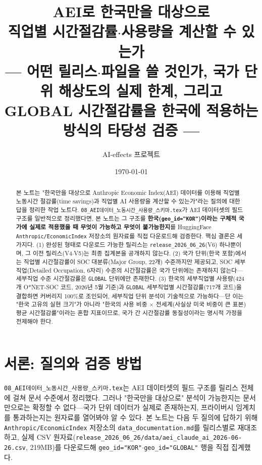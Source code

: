 \documentclass[11pt]{article}
\title{AEI로 한국만을 대상으로\\[1mm]
직업별 시간절감률$\cdot$사용량을 계산할 수 있는가\\[2mm]
\large --- 어떤 릴리스$\cdot$파일을 쓸 것인가, 국가 단위 해상도의 실제 한계, 그리고 GLOBAL 시간절감률을 한국에 적용하는 방식의 타당성 검증 ---}
\author{AI-effects 프로젝트}
\date{\today}
\begin{document}
\maketitle

\begin{abstract}
\noindent 본 노트는 "한국만을 대상으로 Anthropic Economic Index(AEI) 데이터를 이용해 직업별 노동시간 절감률(time savings)과 직업별 AI 사용량을 계산할 수 있는가"라는 질의에 대한 답을 정리한 작업 노트다. \texttt{08\_AEI데이터\_노동시간\_사용량\_스키마.tex}가 AEI 데이터셋의 필드 구조를 일반적으로 정리했다면, 본 노트는 그 구조를 \textbf{한국(\texttt{geo\_id="KOR"})이라는 구체적 국가에 실제로 적용했을 때 무엇이 가능하고 무엇이 불가능한지}를 HuggingFace \texttt{Anthropic/EconomicIndex} 저장소의 원자료를 직접 다운로드해 검증한다. 핵심 결론은 세 가지다. (1) 완성된 형태로 다운로드 가능한 릴리스는 \texttt{release\_2026\_06\_26}(V6) 하나뿐이며, 그 이전 릴리스(V4$\cdot$V5)는 최종 집계본을 공개하지 않는다. (2) 국가 단위(한국 포함)에서는 직업별 시간절감률이 SOC 대분류(Major Group, 22개) 수준까지만 제공되고, SOC 세부직업(Detailed Occupation, 6자리) 수준의 시간절감률은 국가 단위에는 존재하지 않는다---세부직업 수준 시간절감률은 \texttt{GLOBAL} 단위에만 존재한다. (3) 한국의 세부직업별 사용량(424개 O*NET-SOC 코드, 2026년 5월 기준)과 \texttt{GLOBAL} 세부직업별 시간절감률(717개 코드)을 결합하면 커버리지 100\%로 조인되어, 세부직업 단위 분석이 기술적으로 가능하다---단 이는 "한국 고유의 실현 크기"가 아니라 "한국의 사용 비중 $\times$ 전세계(사실상 미국 비중이 큰 표본) 평균 시간절감률"이라는 혼합 지표이므로, 국가 간 시간절감률 동질성이라는 명시적 가정을 전제해야 한다.
\end{abstract}

\tableofcontents

\section{서론: 질의와 검증 방법}

\texttt{08\_AEI데이터\_노동시간\_사용량\_스키마.tex}는 AEI 데이터셋의 필드 구조를 릴리스 전체에 걸쳐 문서 수준에서 정리했다. 그러나 "한국만을 대상으로" 분석이 가능한지는 문서만으로는 확정할 수 없다---국가 단위 데이터가 실제로 존재하는지, 프라이버시 임계치를 통과하는지는 원자료를 열어봐야 알 수 있다. 본 노트는 다음 두 질의에 답하기 위해 \texttt{Anthropic/EconomicIndex} 저장소의 \texttt{data\_documentation.md}를 릴리스별로 재대조하고, 실제 CSV 원자료(\texttt{release\_2026\_06\_26/data/aei\_claude\_ai\_2026-06-26.csv}, 219MB)를 다운로드해 \texttt{geo\_id="KOR"}$\cdot$\texttt{geo\_id="GLOBAL"} 행을 직접 집계했다.
\end{document}
